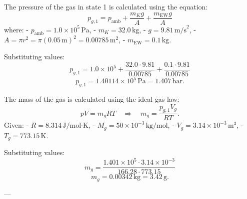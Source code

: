 The pressure of the gas in state 1 is calculated using the equation:  
\[
p_{g,1} = p_{\text{amb}} + \frac{m_K g}{A} + \frac{m_{\text{EW}} g}{A}
\]  
where:  
- \( p_{\text{amb}} = 1.0 \times 10^5 \, \text{Pa} \),  
- \( m_K = 32.0 \, \text{kg} \),  
- \( g = 9.81 \, \text{m/s}^2 \),  
- \( A = \pi r^2 = \pi (0.05 \, \text{m})^2 = 0.00785 \, \text{m}^2 \),  
- \( m_{\text{EW}} = 0.1 \, \text{kg} \).  

Substituting values:  
\[
p_{g,1} = 1.0 \times 10^5 + \frac{32.0 \cdot 9.81}{0.00785} + \frac{0.1 \cdot 9.81}{0.00785}
\]  
\[
p_{g,1} = 1.40114 \times 10^5 \, \text{Pa} = 1.407 \, \text{bar}.
\]  

The mass of the gas is calculated using the ideal gas law:  
\[
pV = m_g RT \quad \Rightarrow \quad m_g = \frac{p_{g,1} V_g}{RT}.
\]  
Given:  
- \( R = 8.314 \, \text{J/mol·K} \),  
- \( M_g = 50 \times 10^{-3} \, \text{kg/mol} \),  
- \( V_g = 3.14 \times 10^{-3} \, \text{m}^3 \),  
- \( T_g = 773.15 \, \text{K} \).  

Substituting values:  
\[
m_g = \frac{1.401 \times 10^5 \cdot 3.14 \times 10^{-3}}{166.28 \cdot 773.15}
\]  
\[
m_g = 0.00342 \, \text{kg} = 3.42 \, \text{g}.
\]  

---